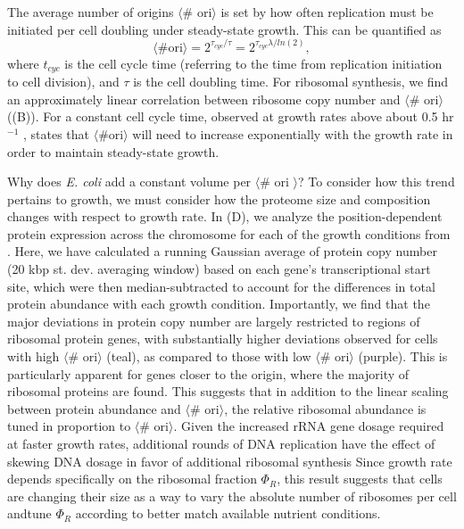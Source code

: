 The average number of origins $\langle$\# ori$\rangle$ is set by how often
replication must be initiated per cell doubling under steady-state growth.
This can be quantified as
\begin{equation}
    \langle \text{\# ori} \rangle = 2^{\tau_{cyc} / \tau} = 2^{\tau_{cyc} \lambda / ln(2)},
    \label{eq:Nori}
\end{equation}
where $t_{cyc}$ is the cell cycle time (referring to the time from replication
initiation to cell division), and $\tau$ is the cell doubling time. For
ribosomal synthesis, we find an approximately linear correlation between
ribosome copy number and $\langle$\# ori$\rangle$
((B)). For a constant cell cycle time, observed at
growth rates above about 0.5 hr$^{-1}$ \citep{helmstetter1968},  states
that $\langle \text{\# ori} \rangle$ will need to increase exponentially with
the growth rate in order to maintain steady-state growth.


Why does \textit{E. coli} add a constant volume per $\langle$\# ori $\rangle$?
To consider how this trend pertains to growth, we must consider
how the proteome size and composition changes with respect to growth rate. In
(D), we analyze the position-dependent protein
expression across the chromosome for each of the growth conditions from
\cite{schmidt2016}. Here, we have calculated a running Gaussian average of
protein copy number (20 kbp st. dev. averaging window) based on each gene's
transcriptional start site, which were then median-subtracted to account for the
differences in total protein abundance with each growth condition. Importantly,
we find that the major deviations in protein copy number are largely restricted
to regions of ribosomal protein genes, with substantially higher deviations
observed for cells with high $\langle$\# ori$\rangle$ (teal), as compared to
those with low $\langle$\# ori$\rangle$ (purple). This is particularly apparent
for genes closer to the origin, where the majority of ribosomal proteins are
found. This suggests that in addition to the linear scaling between protein
abundance and $\langle$\# ori$\rangle$, the relative ribosomal abundance is
tuned in proportion to $\langle$\# ori$\rangle$.  Given the increased rRNA gene
dosage required at faster growth rates, additional rounds of DNA replication
have the effect of skewing DNA dosage in favor of additional ribosomal synthesis
Since growth rate depends specifically on the ribosomal fraction $\Phi_R$, this
result suggests that cells are changing their size as a way to vary the absolute
number of ribosomes per cell andtune $\Phi_R$ according to better match
available nutrient conditions.


